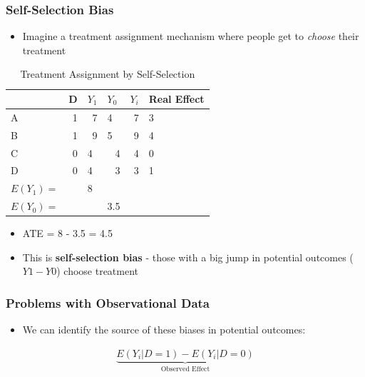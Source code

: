 \documentclass[xcolor=x11names,compress]{beamer}\usepackage[]{graphicx}\usepackage[]{color}
\renewcommand{\(}{\begin{columns}}
\renewcommand{\)}{\end{columns}}
\newcommand{\<}[1]{\begin{column}{#1}}
\renewcommand{\>}{\end{column}}
\begin{document}
\begin{frame}
\frametitle{Self-Selection Bias}
\begin{itemize}
\item Imagine a treatment assignment mechanism where people get to \textit{choose} their treatment
\end{itemize}
\begin{table}[htbp]
  \centering
  \caption{Treatment Assignment by Self-Selection}
    \begin{tabular}{|l|r|l|r|r|l|}
    \hline
          & \multicolumn{1}{l|}{D} & $Y_1$  & \multicolumn{1}{l|}{$Y_0$} & \multicolumn{1}{l|}{$Y_i$} & Real Effect \bigstrut\\
    \hline
    A     & 1     & \multicolumn{1}{r|}{\cellcolor{teal}7} & \multicolumn{1}{l|}{4} & 7     & 3 \bigstrut\\
    \hline
    B     & 1     & \multicolumn{1}{r|}{\cellcolor{teal}9} & \multicolumn{1}{l|}{5} & 9     & 4 \bigstrut\\
    \hline
    C     & 0     & 4     & \cellcolor{teal}4     & 4     & 0 \bigstrut\\
    \hline
    D     & 0     & 4     & \cellcolor{teal}3     & 3     & 1 \bigstrut\\
    \hline \pause
    $E(Y_1)=$ & & 8 & & \bigstrut\\
    \hline
    $E(Y_0)=$ & &  & 3.5 & \bigstrut\\
    \hline
    \end{tabular}%
\end{table}%
\begin{itemize}
\pause
\item ATE = 8 - 3.5 = 4.5
\item This is \textbf{self-selection bias} - those with a big jump in potential outcomes ($Y1 - Y0$) choose treatment
\end{itemize}
\end{frame}

\begin{frame}
\frametitle{Problems with Observational Data}
\begin{itemize}
\item We can identify the source of these biases in potential outcomes:
\pause
\end{itemize}
\begin{multline}
\underbrace{E(Y_i|D=1)-E(Y_i|D=0)}_\text{Observed Effect}
\end{multline}
\end{frame}
\end{document}
